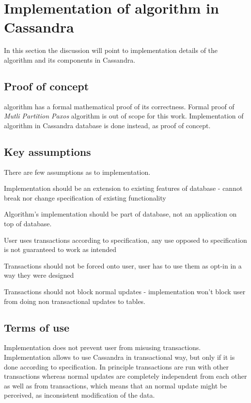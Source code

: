 

\chapter{Implementation of algorithm in Cassandra}\label{sec:mpp:impl}
In this section the discussion will point to implementation details of the algorithm and its components in Cassandra. 


\section{Proof of concept}
\paxos algorithm has a formal mathematical proof of its correctness. \cite{Lamport1998partTimeParliment} Formal proof of \emph{Mutli Partition Paxos} algorithm is out of scope for this work. Implementation of algorithm in Cassandra database is done instead, as proof of concept. 




\section{Key assumptions}
There are few assumptions as to implementation.
\begin{enumerate*}
\item  Implementation should be an extension to existing features of database - cannot break nor change specification of existing functionality
\item Algorithm’s implementation should be part of database, not an application on top of database.
\item User uses transactions according to specification, any use opposed to specification is not guaranteed to work as intended
\item Transactions should not be forced onto user, user has to use them as opt-in in a way they were designed
\item Transactions should not block normal updates - implementation won’t block user from doing non transactional updates to tables.
\end{enumerate*}

\section{Terms of use}
Implementation does not prevent user from misusing transactions. Implementation allows to use Cassandra in transactional way, but only if it is done according to specification. In principle transactions are run with other transactions whereas normal updates are completely independent from each other as well as from transactions, which means that an normal update might be perceived, as inconsistent modification of the data.

